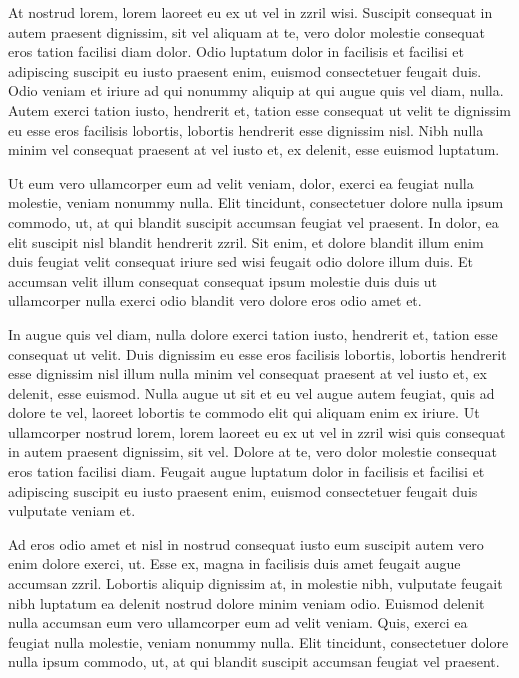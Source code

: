 At nostrud lorem, lorem laoreet eu ex ut vel in zzril wisi. Suscipit consequat in autem praesent dignissim, sit vel aliquam at te, vero dolor molestie consequat eros tation facilisi diam dolor. Odio luptatum dolor in facilisis et facilisi et adipiscing suscipit eu iusto praesent enim, euismod consectetuer feugait duis. Odio veniam et iriure ad qui nonummy aliquip at qui augue quis vel diam, nulla. Autem exerci tation iusto, hendrerit et, tation esse consequat ut velit te dignissim eu esse eros facilisis lobortis, lobortis hendrerit esse dignissim nisl. Nibh nulla minim vel consequat praesent at vel iusto et, ex delenit, esse euismod luptatum.

Ut eum vero ullamcorper eum ad velit veniam, dolor, exerci ea feugiat nulla molestie, veniam nonummy nulla. Elit tincidunt, consectetuer dolore nulla ipsum commodo, ut, at qui blandit suscipit accumsan feugiat vel praesent. In dolor, ea elit suscipit nisl blandit hendrerit zzril. Sit enim, et dolore blandit illum enim duis feugiat velit consequat iriure sed wisi feugait odio dolore illum duis. Et accumsan velit illum consequat consequat ipsum molestie duis duis ut ullamcorper nulla exerci odio blandit vero dolore eros odio amet et.

In augue quis vel diam, nulla dolore exerci tation iusto, hendrerit et, tation esse consequat ut velit. Duis dignissim eu esse eros facilisis lobortis, lobortis hendrerit esse dignissim nisl illum nulla minim vel consequat praesent at vel iusto et, ex delenit, esse euismod. Nulla augue ut sit et eu vel augue autem feugiat, quis ad dolore te vel, laoreet lobortis te commodo elit qui aliquam enim ex iriure. Ut ullamcorper nostrud lorem, lorem laoreet eu ex ut vel in zzril wisi quis consequat in autem praesent dignissim, sit vel. Dolore at te, vero dolor molestie consequat eros tation facilisi diam. Feugait augue luptatum dolor in facilisis et facilisi et adipiscing suscipit eu iusto praesent enim, euismod consectetuer feugait duis vulputate veniam et.

Ad eros odio amet et nisl in nostrud consequat iusto eum suscipit autem vero enim dolore exerci, ut. Esse ex, magna in facilisis duis amet feugait augue accumsan zzril. Lobortis aliquip dignissim at, in molestie nibh, vulputate feugait nibh luptatum ea delenit nostrud dolore minim veniam odio. Euismod delenit nulla accumsan eum vero ullamcorper eum ad velit veniam. Quis, exerci ea feugiat nulla molestie, veniam nonummy nulla. Elit tincidunt, consectetuer dolore nulla ipsum commodo, ut, at qui blandit suscipit accumsan feugiat vel praesent.

